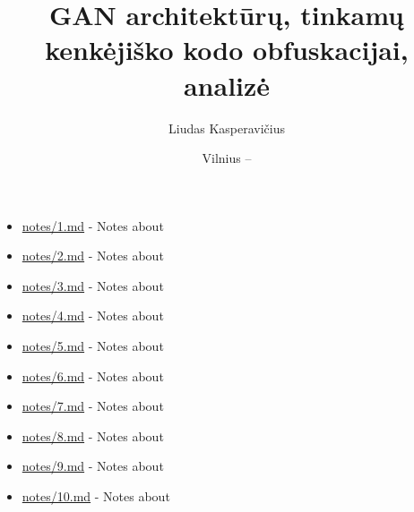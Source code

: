 \documentclass[
    lithuanian, %
]{VUMIFPSkursinis}
\title{GAN architektūrų, tinkamų kenkėjiško kodo obfuskacijai, analizė}
\author{Liudas Kasperavičius}
\date{Vilnius – \the\year}
\begin{document}
\maketitle

\tableofcontents


\begin{itemize}
    \item \url{notes/1.md} - Notes about \cite{nguyenGenerativeAdversarialNetworks2023}
    \item \url{notes/2.md} - Notes about \cite{zhongMalFoxCamouflagedAdversarial2024}
    \item \url{notes/3.md} - Notes about \cite{zhongReinforcementLearningBased2022}
    \item \url{notes/4.md} - Notes about \cite{kawaiImprovedMalGANAvoiding2019}
    \item \url{notes/5.md} - Notes about \cite{huGeneratingAdversarialMalware2017}
    \item \url{notes/6.md} - Notes about \cite{fangEvadingMalwareEngines2019}
    \item \url{notes/7.md} - Notes about \cite{zhuNgramMalGANEvading2022}
    \item \url{notes/8.md} - Notes about \cite{castroAIMEDEvolvingMalware2019}
    \item \url{notes/9.md} - Notes about \cite{andersonLearningEvadeStatic2018}
    \item \url{notes/10.md} - Notes about \cite{demetrioAdversarialEXEmplesSurvey2021}
\end{itemize}





\printbibliography[heading=bibintoc]


\end{document}
